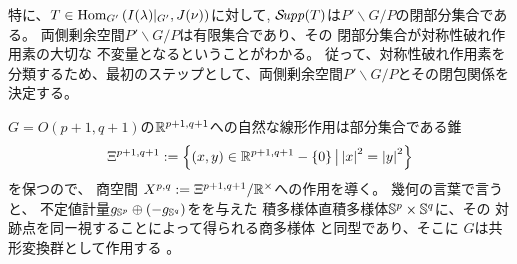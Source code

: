 \documentclass[12pt]{article} %
\newcommand{\Hom}{\mbox{\normalfont Hom}}
\newcommand{\Supp}{\mathcal{S}\!{\it upp}}
\theoremstyle{definition}
\theoremstyle{exampstyle} \newtheorem{examp}[theorem]{Theorem}
\newcommand{\IlambdaGprime}{I(\lambda)\kern-0.3em\mid_{G'}}
\newcommand{\SBO}{\Hom_{G'}\left(\IlambdaGprime,J(\nu) \right)}
\renewcommand{\setminus}{-}
\newcommand{\doubt}[1]{\uwave{#1}}
\begin{document}
特に、$T\in\SBO$に対して, $\Supp(T)$は$P'\backslash G/P$の閉部分集合である。
両側剰余空間$P'\backslash G/P$は有限集合であり、その
閉部分集合が対称性破れ作用素の大切な
不変量となるということがわかる。
従って、対称性破れ作用素を分類するため、最初のステップとして、両側剰余空間$P'\backslash G/P$とその閉包関係を決定する。

$G=O(p+1,q+1)$の$\mathbb{R}^{p+1,q+1}$への自然な線形作用は部分集合である錐
$$\Xi^{p+1,q+1}:=\mysetn{(x,y)\in\R^{p+1,q+1}\setminus\left\{ 0 \right\}}{\myabs{x}^2=\myabs{y}^2}$$
を保つので、
商空間
$X^{p,q}:=\Xi^{p+1,q+1}/\mathbb{R}^{\times}$への作用を導く。
幾何の言葉で言うと、
不定値計量$g_{\mathbb{S}^p}\oplus \left( -g_{\mathbb{S}^q} \right)$をを与えた%
積多様体直積多様体$\mathbb{S}^p\times\mathbb{S}^q$に\doubt{おいして}、その
対跡点を同ー視することによって得られる商多様体
と同型であり、そこに
$G$は共形変換群として作用する
。
\end{document}
